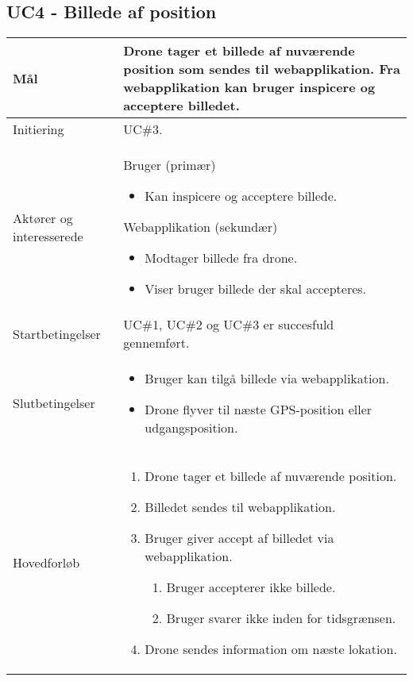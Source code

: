 \subsection*{UC4 - Billede af position}

\begin{table}[H]
\begin{tabular}{| p{3cm}| p{11.5cm}|}
\hline

Mål	 							& Drone tager et billede af nuværende position som sendes til webapplikation. Fra webapplikation kan bruger inspicere og acceptere billedet. \\\hline
Initiering 							& UC\#3. \\\hline
Aktører og interesserede			& Bruger (primær) 
										\begin{itemize}
											\item Kan inspicere og acceptere billede.
										\end{itemize} 
									  Webapplikation (sekundær)
										\begin{itemize}
											\item Modtager billede fra drone.
											\item Viser bruger billede der skal accepteres.
										\end{itemize} \\\hline
Startbetingelser							& UC\#1, UC\#2 og UC\#3 er succesfuld gennemført. \\\hline
Slutbetingelser						& 	\begin{itemize}
											\item Bruger kan tilgå billede via webapplikation.
											\item Drone flyver til næste GPS-position eller udgangsposition.
										\end{itemize} \\\hline
Hovedforløb				&
 
									\renewcommand{\labelenumi}{\arabic{enumi}.}
									\renewcommand{\labelenumii}{\Roman{enumii}:}

									\begin{enumerate}[topsep=0.0cm, leftmargin=0.5cm]
										\item Drone tager et billede af nuværende position.
										\item Billedet sendes til webapplikation.
										\item Bruger giver accept af billedet via webapplikation.
											\begin{enumerate}[partopsep=4cm, topsep=0cm, leftmargin=1cm]
												\item Bruger accepterer ikke billede.
												\item Bruger svarer ikke inden for tidsgrænsen.
											\end{enumerate}
										\item Drone sendes information om næste lokation.
									\end{enumerate} \\\hline	


\end{tabular}
\end{table}
